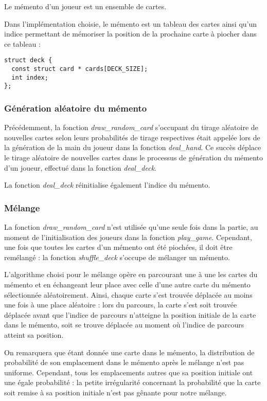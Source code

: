 \documentclass[12pt]{article}
\begin{document}
Le mémento d'un joueur est un ensemble de cartes.

Dans l'implémentation choisie, le mémento est un tableau des cartes ainsi qu'un indice permettant de mémoriser la position de la prochaine carte à piocher dans ce tableau :
\begin{verbatim}
struct deck {
  const struct card * cards[DECK_SIZE];
  int index;
};
\end{verbatim}

\subsubsection{Génération aléatoire du mémento}

Précédemment, la fonction \textit{draw\_random\_card} s'occupant du tirage aléatoire de nouvelles cartes selon leurs probabilités de tirage respectives était appelée lors de la génération de la main du joueur dans la fonction \textit{deal\_hand}. Ce succès déplace le tirage aléatoire de nouvelles cartes dans le processus de génération du mémento d'un joueur, effectué dans la fonction \textit{deal\_deck}.

La fonction \textit{deal\_deck} réinitialise également l'indice du mémento.

\subsubsection{Mélange}

La fonction \textit{draw\_random\_card} n'est utilisée qu'une seule fois dans la partie, au moment de l'initialisation des joueurs dans la fonction \textit{play\_game}. Cependant, une fois que toutes les cartes d'un mémento ont été piochées, il doit être remélangé : la fonction \textit{shuffle\_deck} s'occupe de mélanger un mémento.

L'algorithme choisi pour le mélange opère en parcourant une à une les cartes du mémento et en échangeant leur place avec celle d'une autre carte du mémento sélectionnée aléatoirement. Ainsi, chaque carte s'est trouvée déplacée au moins une fois à une place aléatoire : lors du parcours, la carte s'est soit trouvée déplacée avant que l'indice de parcours n'atteigne la position initiale de la carte dans le mémento, soit se trouve déplacée au moment où  l'indice de parcours atteint sa position.

On remarquera que étant donnée une carte dans le mémento, la distribution de probabilité de son emplacement dans le mémento après le mélange n'est pas uniforme. Cependant, tous les emplacements autres que sa position initiale ont une égale probabilité : la petite irrégularité concernant la probabilité que la carte soit remise à sa position initiale n'est pas gênante pour notre mélange.
\end{document}
